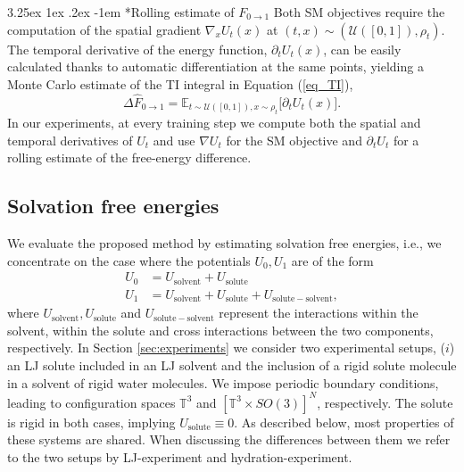 \documentclass[%
onecolumn,
superscriptaddress,
nofootinbib,
amsmath,amssymb,
table
]{revtex4-2}
\makeatletter
\renewcommand\paragraph{%
  \@startsection{paragraph}{4}{\z@}%
    {3.25ex \@plus1ex \@minus.2ex}%
    {-1em}%
    {\normalfont\normalsize\bfseries}%
}
\makeatother
\begin{document}
\paragraph*{Rolling estimate of $F_{0\to 1}$} Both SM objectives require the computation of the spatial gradient $\nabla_x U_t (x)$ at $(t,x)\sim(\mathcal U([0,1]),\rho_t)$. The temporal derivative of the energy function, $\partial_t U_t (x)$, can be easily calculated thanks to automatic differentiation at the same points, yielding a Monte Carlo estimate of the TI integral in Equation (\ref{eq_TI}),
\begin{equation}
    \label{eq:rolling_estimate}
    \Delta \hat F_{0\rightarrow 1} = \mathbb E_{t\sim\mathcal U([0,1]),x\sim \rho_t}\big[  \partial_t U_t(x)\big].
\end{equation}
In our experiments, at every training step we compute both the spatial and temporal derivatives of $U_t$  and use $\nabla U_t$ for the SM objective and $\partial_t U_t$ for a rolling estimate of the free-energy difference.

\subsection*{Solvation free energies}
We evaluate the proposed method by estimating solvation free energies, i.e., we concentrate on the case where the potentials $U_0, U_1$ are of the form
\begin{align}
    U_0 &= U_{\mathrm{solvent}} + U_{\mathrm{solute}} \\
    U_1 &= U_{\mathrm{solvent}} + U_{\mathrm{solute}}+ U_{\mathrm{solute-solvent}}, 
\end{align}
where $U_{\mathrm{solvent}}, U_{\mathrm{solute}}$ and $U_{\mathrm{solute-solvent}}$ represent the interactions within the solvent, within the solute and cross interactions between the two components, respectively. In Section \ref{sec:experiments} we consider two experimental setups, ($i$) an LJ solute included in an LJ solvent and the inclusion of a rigid solute molecule in a solvent of rigid water molecules. We impose periodic boundary conditions, leading to configuration spaces $\mathbb T^{3}$ and $[\mathbb T^{3}\times SO(3)]^N$, respectively. The solute is rigid in both cases, implying $U_{\mathrm{solute}} \equiv 0$. As described below, most properties of these systems are shared. When discussing the differences between them we refer to the two setups by {LJ-experiment} and {hydration-experiment}.
\end{document}
